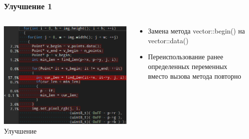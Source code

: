 \documentclass[10pt]{beamer}
\begin{document}
\begin{frame}
\frametitle{Улучшение 1}


\begin{columns}[c]

\begin{center}
  \includegraphics[width=\textwidth]{res/img/AnalysisTargetWizard2CodeCropped.png}
  Улучшение
\end{center}

\begin{block}{}
  \begin{itemize}
    \item Замена метода vector::begin() на vector::data()
    \item Переиспользование ранее определенных переменных вместо вызова метода повторно
  \end{itemize}
\end{block}

\end{columns}

\end{frame}
\end{document}
